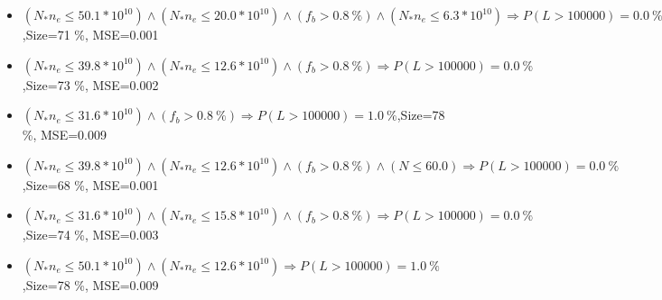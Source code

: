 \documentclass[numbered]{CSL}
\begin{document}
\begin{itemize}
\item $(N_* n_e \leq 50.1 * 10^{10}) \land (N_* n_e \leq 20.0 * 10^{10}) \land (f_b > 0.8~\%) \land (N_* n_e \leq 6.3 * 10^{10}) \Rightarrow P(L > 100 000) = 0.0~\%$,\hfill Size=71 \%, MSE=0.001
\item $(N_* n_e \leq 39.8 * 10^{10}) \land (N_* n_e \leq 12.6 * 10^{10}) \land (f_b > 0.8~\%) \Rightarrow P(L > 100 000) = 0.0~\%$,\hfill Size=73 \%, MSE=0.002
\item $(N_* n_e \leq 31.6 * 10^{10}) \land (f_b > 0.8~\%) \Rightarrow P(L > 100 000) = 1.0~\%$,\hfill Size=78 \%, MSE=0.009
\item $(N_* n_e \leq 39.8 * 10^{10}) \land (N_* n_e \leq 12.6 * 10^{10}) \land (f_b > 0.8~\%) \land (N \leq 60.0) \Rightarrow P(L > 100 000) = 0.0~\%$,\hfill Size=68 \%, MSE=0.001
\item $(N_* n_e \leq 31.6 * 10^{10}) \land (N_* n_e \leq 15.8 * 10^{10}) \land (f_b > 0.8~\%) \Rightarrow P(L > 100 000) = 0.0~\%$,\hfill Size=74 \%, MSE=0.003
\item $(N_* n_e \leq 50.1 * 10^{10}) \land (N_* n_e \leq 12.6 * 10^{10}) \Rightarrow P(L > 100 000) = 1.0~\%$,\hfill Size=78 \%, MSE=0.009
\end{itemize}
\end{document}
